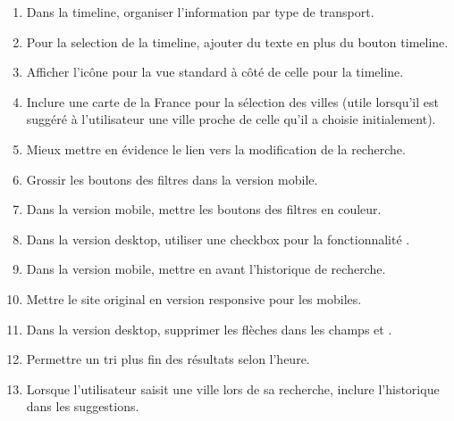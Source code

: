 \begin{enumerate}
\item Dans la timeline, organiser l'information par type de transport.
\item Pour la selection de la timeline, ajouter du texte en plus du bouton timeline.
\item Afficher l'ic\^{o}ne pour la vue standard \`{a} c\^{o}t\'{e} de celle pour la timeline.
\item Inclure une carte de la France pour la s\'{e}lection des villes (utile lorsqu'il est sugg\'{e}r\'{e} \`{a} l'utilisateur une ville proche de celle qu'il a choisie initialement).
\item Mieux mettre en \'{e}vidence le lien vers la modification de la recherche.
\item Grossir les boutons des filtres dans la version mobile.
\item Dans la version mobile, mettre les boutons des filtres en couleur.
\item Dans la version desktop, utiliser une checkbox pour la fonctionnalit\'{e} .
\item Dans la version mobile, mettre en avant l'historique de recherche.
\item Mettre le site original en version responsive pour les mobiles.
\item Dans la version desktop, supprimer les fl\`{e}ches dans les champs  et .
\item Permettre un tri plus fin des r\'{e}sultats selon l'heure.
\item Lorsque l'utilisateur saisit une ville lors de sa recherche, inclure l'historique dans les suggestions.
\end{enumerate}